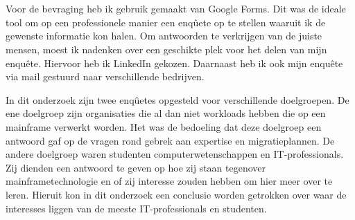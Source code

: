 \section{}
\label{sec:De bevraging}

Voor de bevraging heb ik gebruik gemaakt van Google Forms. Dit was de ideale tool om op een professionele manier een enqûete op te stellen waaruit ik de gewenste informatie kon halen. Om antwoorden te verkrijgen van de juiste mensen, moest ik nadenken over een geschikte plek voor het delen van mijn enquête. Hiervoor heb ik LinkedIn gekozen. Daarnaast heb ik ook mijn enquête via mail gestuurd naar verschillende bedrijven. 

In dit onderzoek zijn twee enqûetes opgesteld voor verschillende doelgroepen. De ene doelgroep zijn organisaties die al dan niet workloads hebben die op een mainframe verwerkt worden. Het was de bedoeling dat deze doelgroep een antwoord gaf op de vragen rond gebrek aan expertise en migratieplannen. De andere doelgroep waren studenten computerwetenschappen en IT-professionals. Zij dienden een antwoord te geven op hoe zij staan tegenover mainframetechnologie en of zij interesse zouden hebben om hier meer over te leren. Hieruit kon in dit onderzoek een conclusie worden getrokken over waar de interesses liggen van de meeste IT-professionals en studenten.

